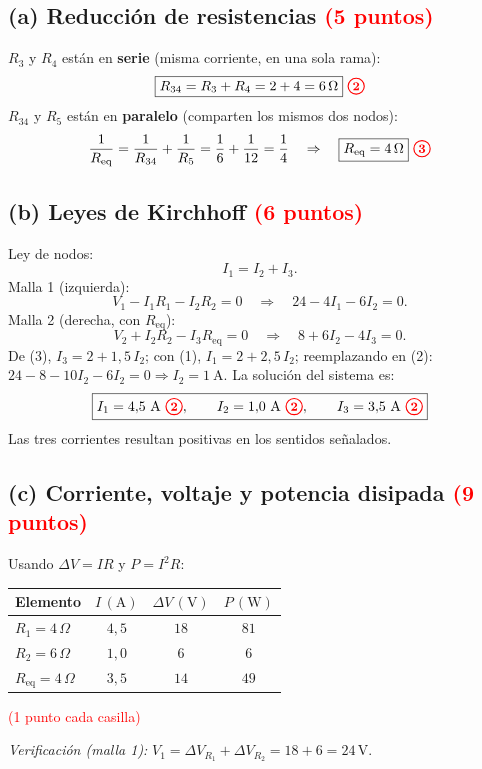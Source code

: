 \documentclass[12pt,letterpaper]{article}
\newcommand{\pts}[1]{\tikz[baseline=(c.base)]\node[circle,draw=red,text=red,thick,inner sep=1.3pt,font=\small\bfseries](c){#1};}
\newcommand{\Vv}{\,\mathrm{V}}
\begin{document}
\subsection*{(a) Reducci\'on de resistencias \quad\textcolor{red}{(5 puntos)}}
$R_3$ y $R_4$ est\'an en \textbf{serie} (misma corriente, en una sola rama):
\[
    \boxed{R_{34} = R_3 + R_4 = 2 + 4 = 6\,\Omega}\ \pts{2}
\]
$R_{34}$ y $R_5$ est\'an en \textbf{paralelo} (comparten los mismos dos nodos):
\[
    \frac{1}{R_{\mathrm{eq}}} = \frac{1}{R_{34}} + \frac{1}{R_5} = \frac{1}{6} + \frac{1}{12} = \frac{1}{4}
    \quad\Rightarrow\quad \boxed{R_{\mathrm{eq}} = 4\,\Omega}\ \pts{3}
\]

\subsection*{(b) Leyes de Kirchhoff \quad\textcolor{red}{(6 puntos)}}
Ley de nodos:
\begin{equation} I_1 = I_2 + I_3. \tag{1}\end{equation}
Malla 1 (izquierda):
\begin{equation} V_1 - I_1R_1 - I_2R_2 = 0
\quad\Rightarrow\quad 24 - 4I_1 - 6I_2 = 0. \tag{2}\end{equation}
Malla 2 (derecha, con $R_{\mathrm{eq}}$):
\begin{equation} V_2 + I_2R_2 - I_3R_{\mathrm{eq}} = 0
\quad\Rightarrow\quad 8 + 6I_2 - 4I_3 = 0. \tag{3}\end{equation}
De (3), $I_3 = 2 + 1{,}5\,I_2$; con (1), $I_1 = 2 + 2{,}5\,I_2$; reemplazando en (2):
$24 - 8 - 10I_2 - 6I_2 = 0 \Rightarrow I_2 = 1\ \mathrm{A}$. La soluci\'on del sistema es:
\[
    \boxed{I_1 = 4{,}5\ \mathrm{A}\ \pts{2},\qquad I_2 = 1{,}0\ \mathrm{A}\ \pts{2},\qquad
    I_3 = 3{,}5\ \mathrm{A}\ \pts{2}}
\]
Las tres corrientes resultan positivas en los sentidos se\~nalados.

\newpage
\subsection*{(c) Corriente, voltaje y potencia disipada \quad\textcolor{red}{(9 puntos)}}
Usando $\Delta V = IR$ y $P = I^2R$:
\begin{center}
\renewcommand{\arraystretch}{1.3}
\begin{tabular}{lccc}
\toprule
Elemento & $I\,(\mathrm{A})$ & $\Delta V\,(\mathrm{V})$ & $P\,(\mathrm{W})$\\
\midrule
$R_1 = 4\,\Omega$ & $4{,}5$ & $18$ & $81$\\
$R_2 = 6\,\Omega$ & $1{,}0$ & $6$ & $6$\\
$R_{\mathrm{eq}} = 4\,\Omega$ & $3{,}5$ & $14$ & $49$\\
\bottomrule
\end{tabular}

\smallskip
\textcolor{red}{(1 punto cada casilla)}
\end{center}
\textit{Verificaci\'on (malla 1):} $V_1 = \Delta V_{R_1} + \Delta V_{R_2} = 18 + 6 = 24\Vv$.
\end{document}

